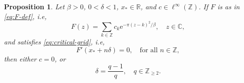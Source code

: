 \documentclass[11pt]{amsart}
\numberwithin{equation}{section}
\newtheorem{proposition}[theorem]{Proposition}
\theoremstyle{definition}
\theoremstyle{remark}
\newcommand{\R}{\mathbb R}
\newcommand{\C}{\mathbb C}
\newcommand{\Z}{\mathbb Z}
\newcommand{\e}{\mathrm e}
\begin{document}
\begin{proposition}\label{prop:critical}
    Let $\beta>0$, $0<\delta<1$, $x_*\in\R$, and $c\in\ell^\infty(\Z)$. If $F$ is as in \eqref{eq:F-def}, i.e,
    \begin{equation}
        F(z) = \sum_{k \in \Z} c_k \e^{-\pi(z-k)^2/\beta}, \quad z \in \C,
    \end{equation}
    and satisfies \eqref{eq:critical-grid}, i.e,
    \begin{equation}
        F'(x_*+n\delta)=0, \quad \text{for all } n \in \Z,
    \end{equation}
    then either $c=0$, or
    \begin{equation}
        \delta=\frac{q-1}{q}, \quad q \in \Z_{\geq 2}.
    \end{equation}
\end{proposition}
\end{document}
